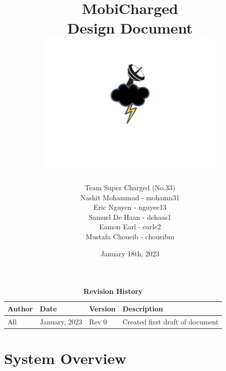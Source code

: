 \documentclass[12pt, titlepage]{article}
\begin{document}
\title{
    MobiCharged\\Design Document 
    \includegraphics[width=9cm]{images/mobicharged.png} 
}
\author{Team Super Charged (No.33)
		\\ Nashit Mohammad - mohamn31
		\\ Eric Nguyen - nguyee13
		\\ Samuel De Haan - dehaas1
		\\ Eamon Earl - earle2
		\\ Mustafa Choueib - choueibm
}
    

\date{January 18th, 2023}


\maketitle

\tableofcontents
\listoffigures
\listoftables

\vspace{20pt}
\begin{center}
\begin{table}[H]
\caption{\bf Revision History}
    \begin{tabular}{p{2cm}p{3cm}p{2cm}p{6cm}}
    \hline
    \bf Author & \bf Date & \bf Version & \bf Description\\
    \hline
    All & January, 2023 & Rev 0 & Created first draft of document\\
    \hline
    \end{tabular}
\end{table}
\end{center}

\newpage


\section{System Overview}
\end{document}
